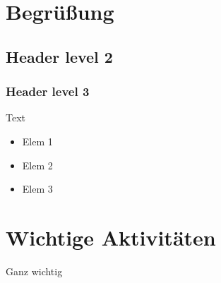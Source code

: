 \documentclass{template/rac-meeting}
\begin{document}
\makeRacTitle

\section{Begrüßung}
\subsection{Header level 2}
\subsubsection{Header level 3}
Text

\begin{itemize}
    \item Elem 1
    \item Elem 2
    \item Elem 3
\end{itemize}

\section{Wichtige Aktivitäten}

Ganz wichtig

\printtodos{}
\end{document}
